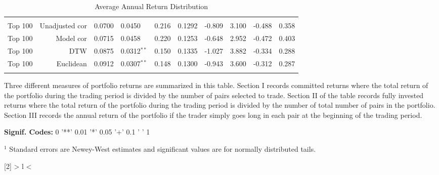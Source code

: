 \documentclass[12pt]{article}
\begin{document}
\begin{table}[hp]
\begin{tabular}{l r r l r r r r r r}
        \vspace{-1mm} \\
        Top 100   & Unadjusted cor & 0.0700 & 0.0450          & 0.216 & 0.1292 & -0.809 & 3.100 & -0.488 & 0.358 \\
        Top 100   & Model cor      & 0.0715 & 0.0458          & 0.220 & 0.1253 & -0.648 & 2.952 & -0.472 & 0.403 \\
        Top 100   & DTW            & 0.0875 & 0.0312{$^{**}$} & 0.150 & 0.1335 & -1.027 & 3.882 & -0.334 & 0.288 \\
        Top 100   & Euclidean      & 0.0912 & 0.0307{$^{**}$} & 0.148 & 0.1300 & -0.943 & 3.600 & -0.312 & 0.287 \\
        \vspace{-1mm} \\
        \hline
    \end{tabular}
    \caption{Average Annual Return Distribution}
    \begin{tablenotes}
        \item{\footnotesize Three different measures of portfolio returns are summarized in this table. Section I records committed returns where the total return of the portfolio during the trading period is divided by the number of pairs selected to trade. Section II of the table records fully invested returns where the total return of the portfolio during the trading period is divided by the number of total number of pairs in the portfolio. Section III records the annual return of the portfolio if the trader simply goes long in each pair at the beginning of the trading period.}
        \item{\footnotesize \textbf{Signif. Codes:} 0 '**' 0.01 '*' 0.05 '+' 0.1 ' ' 1}
        \item{\footnotesize $^{1}$ Standard errors are Newey-West estimates and significant values are for normally distributed tails.} 
    \end{tablenotes}
    \label{tbl:PairsTradingReturns}
\end{table}


\newcolumntype{R}[2]{%
    >{\bgroup}%
    l%
    <{\egroup}%
}
\newcommand*\rot{\multicolumn{1}{R{30}{1em}}}%
\end{document}
